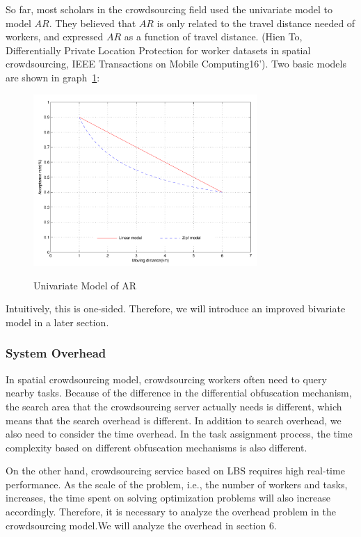 So far, most scholars in the crowdsourcing field used the univariate model to model $AR$. They believed that $AR$ is only related to the travel distance needed of workers, and expressed $AR$ as a function of travel distance. (Hien To, Differentially Private Location Protection for worker datasets in spatial crowdsourcing, IEEE Transactions on Mobile Computing16'). Two basic models are shown in graph~\ref{img:UniModel}:

\begin{figure}
\includegraphics[width=8.5cm]{UniModel}
\label{img:UniModel}
\caption{Univariate Model of AR}
\end{figure}

Intuitively, this is one-sided. Therefore, we will introduce an improved bivariate model in a later section.

\subsubsection{System Overhead}
In spatial crowdsourcing model, crowdsourcing workers often need to query nearby tasks. Because of the difference in the differential obfuscation mechanism, the search area that the crowdsourcing server actually needs is different, which means that the search overhead is different. In addition to search overhead, we also need to consider the time overhead. In the task assignment process, the time complexity based on different obfuscation mechanisms is also different.

On the other hand, crowdsourcing service based on LBS requires high real-time performance. As the scale of the problem, i.e., the number of workers and tasks, increases, the time spent on solving optimization problems will also increase accordingly. Therefore, it is necessary to analyze the overhead problem in the crowdsourcing model.We will analyze the overhead in section 6.

